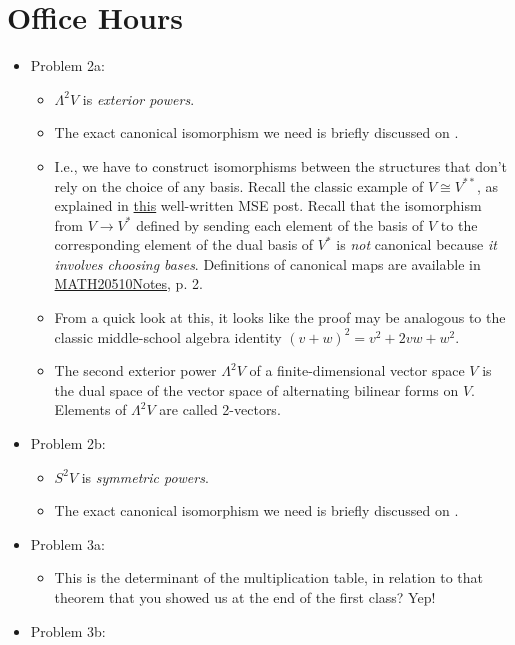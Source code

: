 \documentclass[../notes.tex]{subfiles}
\begin{document}
\section{Office Hours}
\begin{itemize}
    \item {}Problem 2a:
    \begin{itemize}
        \item $\Lambda^2V$ is \emph{exterior powers}.
        \item The exact canonical isomorphism we need is briefly discussed on \textcite[473]{bib:FultonHarris}.
        \item I.e., we have to construct isomorphisms between the structures that don't rely on the choice of any basis. Recall the classic example of $V\cong V^{**}$, as explained in \href{https://math.stackexchange.com/a/3203049/340652}{this} well-written MSE post. Recall that the isomorphism from $V\to V^*$ defined by sending each element of the basis of $V$ to the corresponding element of the dual basis of $V^*$ is \emph{not} canonical because \emph{it involves choosing bases}. Definitions of canonical maps are available in \href{https://github.com/shadypuck/MATH20510Notes/blob/master/Notes/notes.pdf}{MATH20510Notes}, p. 2.
        \item From a quick look at this, it looks like the proof may be analogous to the classic middle-school algebra identity $(v+w)^2=v^2+2vw+w^2$.
        \item The second exterior power $\Lambda^2V$ of a finite-dimensional vector space $V$ is the dual space of the vector space of alternating bilinear forms on $V$. Elements of $\Lambda^2V$ are called 2-vectors.
    \end{itemize}
    \item Problem 2b:
    \begin{itemize}
        \item $S^2V$ is \emph{symmetric powers}.
        \item The exact canonical isomorphism we need is briefly discussed on \textcite[473]{bib:FultonHarris}.
    \end{itemize}
    \item Problem 3a:
    \begin{itemize}
        \item This is the determinant of the multiplication table, in relation to that theorem that you showed us at the end of the first class? Yep!
    \end{itemize}
    \item Problem 3b:

\end{itemize}
\end{document}
